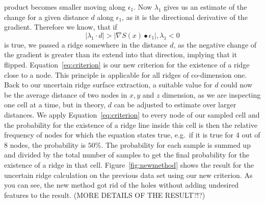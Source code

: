 product becomes smaller moving along $\epsilon_1$. Now $\lambda_1$ gives
us an estimate of the change for a given distance $d$ along
$\epsilon_1$, as it is the directional derivative of the gradient.
Therefore we know, that if
\begin{equation}\label{eq:criterion}
    |\lambda_1 \cdot d| > |\nabla S(x) \bullet \epsilon_1|,\lambda_1 < 0
\end{equation}
is true, we passed a ridge somewhere in the distance $d$, as the
negative change of the gradient is greater than its extend into that
direction, implying that it flipped. Equation~\ref{eq:criterion} is our
new criterion for the existence of a ridge close to a node. This
principle is applicable for all ridges of co-dimension one. Back to our
uncertain ridge surface extraction, a suitable value for $d$ could now
be the average distance of two nodes in $x, y$ and $z$ dimension, as we
are inspecting one cell at a time, but in theory, $d$ can be adjusted to
estimate over larger distances. We apply Equation~\ref{eq:criterion} to
every node of our sampled cell and the probability for the existence of
a ridge line inside this cell is then the relative frequency of nodes
for which the equation states true, e.g.\ if it is true for 4 out of 8
nodes, the probability is $50\%$. The probability for each sample is
summed up and divided by the total number of samples to get the final
probability for the existence of a ridge in that cell.
Figure~\ref{fig:newmethod} shows the result for the uncertain ridge
calculation on the previous data set using our new criterion. As you can
see, the new method got rid of the holes without adding undesired
features to the result. (MORE DETAILS OF THE RESULT?!?)

